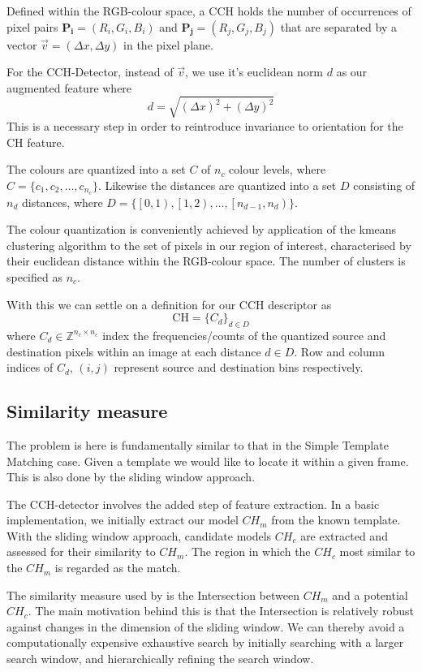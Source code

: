 Defined within the RGB-colour space, a CCH holds the number of occurrences of
pixel pairs $\mathbf{P_i}=(R_i,G_i,B_i)$ and $\mathbf{P_j}=(R_j,G_j,B_j)$ that
are separated by a vector $\vec{v}=(\Delta{x}, \Delta{y})$ in the pixel plane.

For the CCH-Detector, instead of $\vec{v}$, we use it's euclidean norm $d$ as our
augmented feature where 
$$d = \sqrt{{(\Delta{x})}^2 + {(\Delta{y})}^2}$$ 
This is a necessary step in order to reintroduce invariance to orientation for
the CH feature. 

The colours are quantized into a set $C$ of $n_c$ colour levels, where 
$C = \{c_1,c_2,\dots,c_{n_c}\}$. Likewise the distances are quantized into
a set $D$ consisting of $n_d$ distances, where $D = \{\left[ 0,1
\right),\left[ 1,2\right), \dots , \left[ n_{d-1},n_{d} \right)\}$.

The colour quantization is conveniently achieved by application of the kmeans clustering
algorithm to the set of pixels in our region of interest, characterised by their
euclidean distance within the RGB-colour space. The number of clusters is
specified as $n_c$. 

With this we can settle on a definition for our CCH descriptor as
$$\text{CH} = \{C_d\}_{d \in D}$$ 
where $C_d \in \mathbb{Z}^{n_c \times n_c}$ index the
frequencies/counts of the quantized source and destination pixels within an
image at each distance $d \in D$. Row and column indices of
$C_d$, $(i,j)$ represent source and destination bins respectively.  

\subsection{Similarity measure}\label{theoretical_framework_intersection}
The problem is here is fundamentally similar to that in the Simple Template
Matching case. Given a template we would like to locate it within a given frame.
This is also done by the sliding window approach.

The CCH-detector involves the added step of feature extraction. In a basic
implementation, we initially extract our model $CH_m$ from the known template.
With the sliding window approach, candidate models $CH_c$ are extracted and
assessed for their similarity to $CH_m$. The region in which the $CH_c$ most
similar to the $CH_m$ is regarded as the match. 

The similarity measure used by \cite{Chang1999} is the 
Intersection between $CH_m$ and a potential $CH_c$. The main motivation behind
this is that the Intersection is relatively robust against changes in the
dimension of the sliding window.
We can thereby avoid a computationally expensive exhaustive search by initially
searching with a larger search window, and hierarchically refining the search
window.

